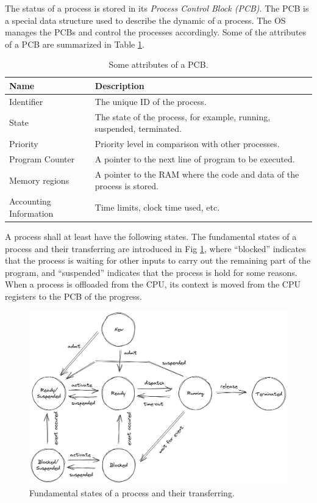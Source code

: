 The status of a process is stored in its \textit{Process Control Block (PCB)}. The PCB is a special data structure used to describe the dynamic of a process. The OS manages the PCBs and control the processes accordingly. Some of the attributes of a PCB are summarized in Table \ref{ch:pm:tab:pcbcontent}.

\begin{table}
	\centering \caption{Some attributes of a PCB.}\label{ch:pm:tab:pcbcontent}
	\begin{tabularx}{\textwidth}{lX}
		\hline
		Name & Description \\ \hline
		Identifier & The unique ID of the process.  \\ \hdashline
		State & The state of the process, for example, running, suspended, terminated.  \\ \hdashline
		Priority & Priority level in comparison with other processes. \\ \hdashline
		Program Counter & A pointer to the next line of program to be executed. \\ \hdashline
		Memory regions & A pointer to the RAM where the code and data of the process is stored. \\ \hdashline
		Accounting Information & Time limits, clock time used, etc. \\ \hline
	\end{tabularx}
\end{table}

A process shall at least have the following states. The fundamental states of a process and their transferring are introduced in Fig \ref{ch:pm:fig:processstatetransfer}, where ``blocked'' indicates that the process is waiting for other inputs to carry out the remaining part of the program, and ``suspended'' indicates that the process is hold for some reasons. When a process is offloaded from the CPU, its context is moved from the CPU registers to the PCB of the progress.

\begin{figure}[htbp]
	\centering
	\includegraphics[width=350pt]{chapters/part-1/figures/processstatetransfer.png}
	\caption{Fundamental states of a process and their transferring.} \label{ch:pm:fig:processstatetransfer}
\end{figure}

